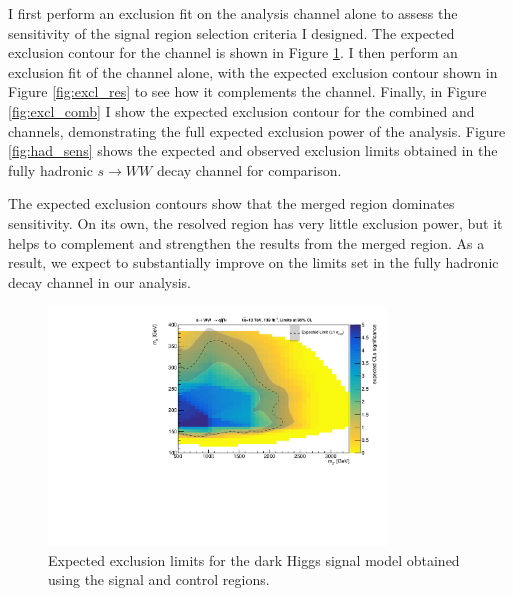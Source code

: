 I first perform an exclusion fit on the \merged analysis channel alone to assess the sensitivity of the \merged signal region selection criteria I designed. The expected exclusion contour for the \merged channel is shown in Figure \ref{fig:excl_mgd}. I then perform an exclusion fit of the \resolved channel alone, with the expected exclusion contour shown in Figure \ref{fig:excl_res} to see how it complements the \merged channel. Finally, in Figure \ref{fig:excl_comb} I show the expected exclusion contour for the combined \merged and \resolved channels, demonstrating the full expected exclusion power of the analysis. Figure \ref{fig:had_sens} shows the expected and observed exclusion limits obtained in the fully hadronic $s\rightarrow WW$ decay channel for comparison.

The expected exclusion contours show that the merged region dominates sensitivity. On its own, the resolved region has very little exclusion power, but it helps to complement and strengthen the results from the merged region. As a result, we expect to substantially improve on the limits set in the fully hadronic decay channel in our analysis.

\begin{figure}[h]
    \centering
    \includegraphics[width=0.8\textwidth]{Figures/5/fits/MERGED.pdf}
    \caption{Expected exclusion limits for the dark Higgs signal model obtained using the \merged signal and control regions.}
    \label{fig:excl_mgd}
\end{figure}

